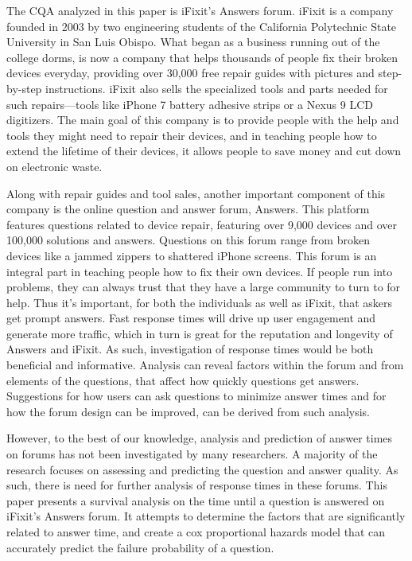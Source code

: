 \documentclass[12pt]{article}
\begin{document}
    The CQA analyzed in this paper is iFixit's Answers forum. iFixit is a company founded in 2003 by two engineering students of the California Polytechnic State University in San Luis Obispo. What began as a business running out of the college dorms, is now a company that helps thousands of people fix their broken devices everyday, providing over 30,000 free repair guides with pictures and step-by-step instructions. iFixit also sells the specialized tools and parts needed for such repairs---tools like iPhone 7 battery adhesive strips or a Nexus 9 LCD digitizers. The main goal of this company is to provide people with the help and tools they might need to repair their devices, and in teaching people how to extend the lifetime of their devices, it allows people to save money and cut down on electronic waste.
    
    Along with repair guides and tool sales, another important component of this company is the online question and answer forum, Answers. This platform features questions related to device repair, featuring over 9,000 devices and over 100,000 solutions and answers. Questions on this forum range from broken devices like a jammed zippers to shattered iPhone screens. This forum is an integral part in teaching people how to fix their own devices. If people run into problems, they can always trust that they have a large community to turn to for help. Thus it's important, for both the individuals as well as iFixit, that askers get prompt answers. Fast response times will drive up user engagement and generate more traffic, which in turn is great for the reputation and longevity of Answers and iFixit. As such, investigation of response times would be both beneficial and informative. Analysis can reveal factors within the forum and from elements of the questions, that affect how quickly questions get answers. Suggestions for how users can ask questions to minimize answer times and for how the forum design can be improved, can be derived from such analysis. 
    
    However, to the best of our knowledge, analysis and prediction of answer times on forums has not been investigated by many researchers. A majority of the research focuses on assessing and predicting the question and answer quality. As such, there is need for further analysis of response times in these forums. This paper presents a survival analysis on the time until a question is answered on iFixit's Answers forum. It attempts to determine the factors that are significantly related to answer time, and create a cox proportional hazards model that can accurately predict the failure probability of a question.
\end{document}
